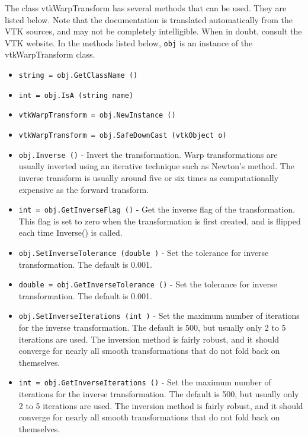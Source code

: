 The class vtkWarpTransform has several methods that can be used.
  They are listed below.
Note that the documentation is translated automatically from the VTK sources,
and may not be completely intelligible.  When in doubt, consult the VTK website.
In the methods listed below, \verb|obj| is an instance of the vtkWarpTransform class.
\begin{itemize}
\item  \verb|string = obj.GetClassName ()|

\item  \verb|int = obj.IsA (string name)|

\item  \verb|vtkWarpTransform = obj.NewInstance ()|

\item  \verb|vtkWarpTransform = obj.SafeDownCast (vtkObject o)|

\item  \verb|obj.Inverse ()| -  Invert the transformation.  Warp transformations are usually
 inverted using an iterative technique such as Newton's method.
 The inverse transform is usually around five or six times as
 computationally expensive as the forward transform.

\item  \verb|int = obj.GetInverseFlag ()| -  Get the inverse flag of the transformation.  This flag is
 set to zero when the transformation is first created, and
 is flipped each time Inverse() is called.

\item  \verb|obj.SetInverseTolerance (double )| -  Set the tolerance for inverse transformation.
 The default is 0.001.

\item  \verb|double = obj.GetInverseTolerance ()| -  Set the tolerance for inverse transformation.
 The default is 0.001.

\item  \verb|obj.SetInverseIterations (int )| -  Set the maximum number of iterations for the inverse
 transformation.  The default is 500, but usually only 
 2 to 5 iterations are used.  The inversion method
 is fairly robust, and it should converge for nearly all smooth
 transformations that do not fold back on themselves.

\item  \verb|int = obj.GetInverseIterations ()| -  Set the maximum number of iterations for the inverse
 transformation.  The default is 500, but usually only 
 2 to 5 iterations are used.  The inversion method
 is fairly robust, and it should converge for nearly all smooth
 transformations that do not fold back on themselves.


\end{itemize}
